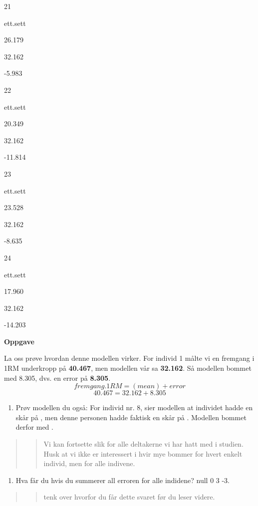 \documentclass[
]{book}
\providecommand{\tightlist}{%
  \setlength{\itemsep}{0pt}\setlength{\parskip}{0pt}}
\begin{document}
21

ett.sett

26.179

32.162

-5.983

22

ett.sett

20.349

32.162

-11.814

23

ett.sett

23.528

32.162

-8.635

24

ett.sett

17.960

32.162

-14.203

\textbf{Oppgave}

La oss prøve hvordan denne modellen virker. For individ 1 målte vi en fremgang i 1RM underkropp på \textbf{40.467}, men modellen vår sa \textbf{32.162}. Så modellen bommet med 8.305, dvs. en error på \textbf{8.305}.
\[
fremgang.1RM = (mean) + error
\]
\[
40.467 = 32.162 + 8.305
\]

\begin{enumerate}
\def\labelenumi{\alph{enumi}.}
\tightlist
\item
  Prøv modellen du også: For individ nr. 8, sier modellen at individet hadde en skår på , men denne personen hadde faktisk en skår på . Modellen bommet derfor med .
\end{enumerate}

\begin{quote}
\begin{quote}
Vi kan fortsette slik for alle deltakerne vi har hatt med i studien. Husk at vi ikke er interessert i hvir mye bommer for hvert enkelt individ, men for alle indivene.
\end{quote}
\end{quote}

\begin{enumerate}
\def\labelenumi{\alph{enumi}.}
\setcounter{enumi}{1}
\tightlist
\item
  Hva får du hvis du summerer all erroren for alle indidene? null 0 3 -3.
\end{enumerate}

\begin{quote}
\begin{quote}
tenk over hvorfor du får dette svaret før du leser videre.
\end{quote}
\end{quote}
\end{document}

